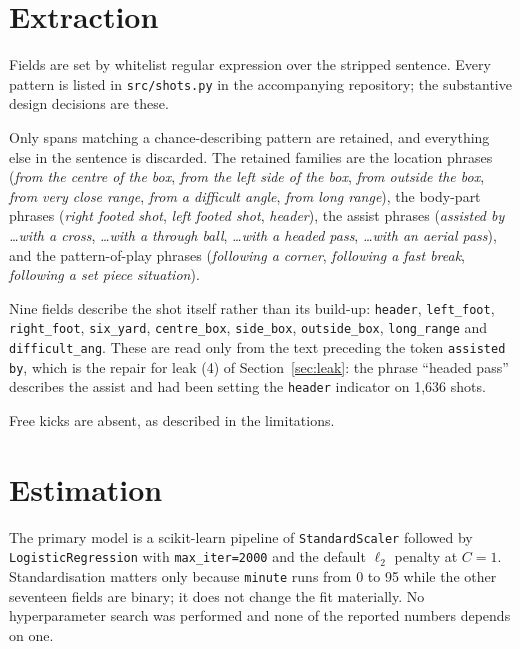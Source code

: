 \documentclass[conference]{IEEEtran}
\newcommand{\num}[1]{\mbox{#1}}
\begin{document}



\appendices

\section{Extraction}
\label{app:extraction}

Fields are set by whitelist regular expression over the stripped sentence.
Every pattern is listed in \texttt{src/shots.py} in the accompanying
repository; the substantive design decisions are these.

Only spans matching a chance-describing pattern are retained, and everything
else in the sentence is discarded. The retained families are the location
phrases (\emph{from the centre of the box}, \emph{from the left side of the
box}, \emph{from outside the box}, \emph{from very close range}, \emph{from a
difficult angle}, \emph{from long range}), the body-part phrases
(\emph{right footed shot}, \emph{left footed shot}, \emph{header}), the
assist phrases (\emph{assisted by \dots with a cross}, \emph{\dots with a
through ball}, \emph{\dots with a headed pass}, \emph{\dots with an aerial
pass}), and the pattern-of-play phrases (\emph{following a corner},
\emph{following a fast break}, \emph{following a set piece situation}).

Nine fields describe the shot itself rather than its build-up:
\texttt{header}, \texttt{left\_foot}, \texttt{right\_foot},
\texttt{six\_yard}, \texttt{centre\_box}, \texttt{side\_box},
\texttt{outside\_box}, \texttt{long\_range} and \texttt{difficult\_ang}. These
are read only from the text preceding the token \texttt{assisted by}, which is
the repair for leak (4) of Section~\ref{sec:leak}: the phrase ``headed pass''
describes the assist and had been setting the \texttt{header} indicator on
\num{1,636} shots.

Free kicks are absent, as described in the limitations.

\section{Estimation}
\label{app:estimation}

The primary model is a scikit-learn pipeline of \texttt{StandardScaler}
followed by \texttt{LogisticRegression} with \texttt{max\_iter=2000} and the
default $\ell_2$ penalty at $C=1$. Standardisation matters only because
\texttt{minute} runs from 0 to 95 while the other seventeen fields are binary;
it does not change the fit materially. No hyperparameter search was performed
and none of the reported numbers depends on one.
\end{document}
